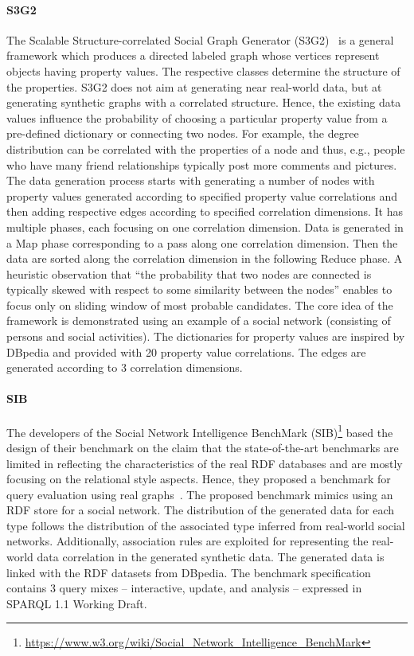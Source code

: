 \paragraph{S3G2} The Scalable Structure-correlated Social Graph Generator
(S3G2)~\cite{Pham2013} is a general framework which produces a directed labeled
graph whose vertices represent objects having property values. The respective
classes determine the structure of the properties. S3G2 does not aim at
generating near real-world data, but at generating synthetic graphs with a
correlated structure. Hence, the existing data values influence the probability
of choosing a particular property value from a pre-defined dictionary or connecting two nodes. For example, the degree distribution can be
correlated with the properties of a node and thus, e.g., people who have many
friend relationships typically post more comments and pictures. The data
generation process starts with generating a number of nodes with property values
generated according to specified property value correlations and then adding
respective edges according to specified correlation dimensions. It has multiple
phases, each focusing on one correlation dimension. Data is generated in a Map
phase corresponding to a pass along one correlation dimension. Then the data are
sorted along the correlation dimension in the following Reduce phase. A
heuristic observation that ``the probability that two nodes are connected is
typically skewed with respect to some similarity between the nodes'' enables to
focus only on sliding window of most probable candidates. The core idea of the
framework is demonstrated using an example of a social network (consisting of
persons and social activities).  The dictionaries for property values are
inspired by DBpedia and provided with 20 property value correlations. The edges
are generated according to 3 correlation dimensions.


\paragraph{SIB} The developers of the Social Network Intelligence BenchMark (SIB)\footnote{\url{https://www.w3.org/wiki/Social_Network_Intelligence_BenchMark}} based the design of their benchmark on the claim that the state-of-the-art benchmarks are limited in reflecting the characteristics of the real RDF databases and are mostly focusing on the relational style aspects. Hence, they proposed a benchmark for  query evaluation using real graphs~\cite{sib}. The proposed benchmark mimics using an RDF store for a social network. \iffalse site where users and their interactions form a social graph of social activities such as creating/managing groups, writing posts and posting comments.\fi The distribution of the generated data for each type follows the  distribution of the associated type inferred from real-world social networks. Additionally, association rules are exploited for representing the real-world data correlation in the generated synthetic data. The  generated data is linked with the RDF datasets from DBpedia. The benchmark specification contains 3 query mixes -- interactive, update, and analysis -- expressed in SPARQL 1.1 Working Draft.


